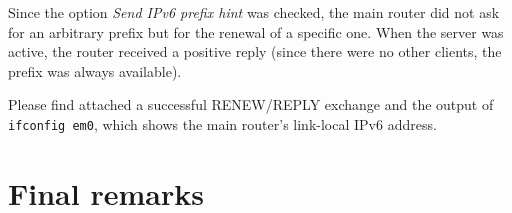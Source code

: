 \documentclass[draft]{homework}
\newcommand{\ip}{IPv6\xspace}
\begin{document}
    Since the option \textit{Send \ip prefix hint} was checked, the main router did not ask for an arbitrary prefix but for the renewal of a specific one.
    When the server was active, the router received a positive reply (since there were no other clients, the prefix was always available).
    
    Please find attached a successful RENEW/REPLY exchange and the output of \texttt{ifconfig em0}, which shows the main router's link-local \ip address.
    
    
    \section{Final remarks}
\end{document}
